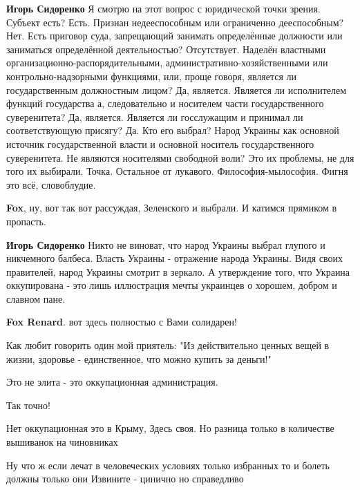 \begin{itemize}
\begin{itemize}
\textbf{Игорь Сидоренко} Я смотрю на этот вопрос с юридической точки зрения. Субъект есть? Есть.
Признан недееспособным или ограниченно дееспособным? Нет.
Есть приговор суда, запрещающий занимать определённые должности или заниматься определённой деятельностью? Отсутствует.
Наделён властными организационно-распорядительными, административно-хозяйственными или контрольно-надзорными функциями, или, проще говоря, является ли государственным должностным лицом? Да, является.
Является ли исполнителем функций государства а, следовательно и носителем части государственного суверенитета? Да, является.
Является ли госслужащим и принимал ли соответствующую присягу? Да.
Кто его выбрал? Народ Украины как основной источник государственной власти и основной носитель государственного суверенитета.
Не являются носителями свободной воли? Это их проблемы, не для того их выбирали.
Точка. Остальное от лукавого. Философия-мылософия. Фигня это всё, словоблудие.

\textbf{Fox}, ну, вот так вот рассуждая, Зеленского и выбрали. И катимся прямиком в пропасть.

\textbf{Игорь Сидоренко} Никто не виноват, что народ Украины выбрал глупого и никчемного балбеса. Власть Украины - отражение народа Украины. Видя своих правителей, народ Украины смотрит в зеркало.
А утверждение того, что Украина оккупирована - это лишь иллюстрация мечты украинцев о хорошем, добром и славном пане.

\textbf{Fox Renard}. вот здесь полностью с Вами солидарен!

\end{itemize} %


Как любит говорить один мой приятель: "Из действительно ценных вещей в жизни,
здоровье - единственное, что можно купить за деньги!"


Это не элита - это оккупационная администрация.

\begin{itemize} %
Так точно!

Нет оккупационная это в Крыму,
Здесь своя.
Но разница только в количестве вышиванок на чиновниках
\end{itemize} %


Ну что ж если лечат в человеческих условиях только избранных то и болеть должны
только они Извините - цинично но справедливо


\end{itemize}
